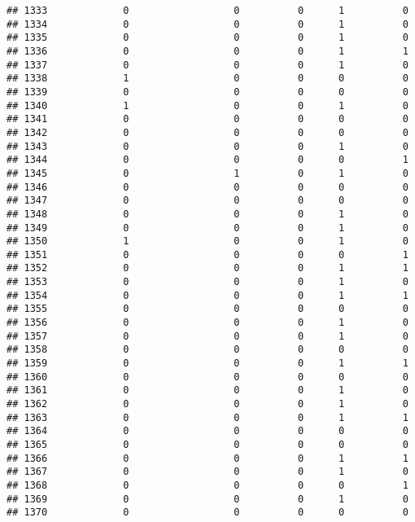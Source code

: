 \documentclass[
]{article}
\begin{document}
\begin{verbatim}
## 1333             0                  0          0      1          0
## 1334             0                  0          0      1          0
## 1335             0                  0          0      1          0
## 1336             0                  0          0      1          1
## 1337             0                  0          0      1          0
## 1338             1                  0          0      0          0
## 1339             0                  0          0      0          0
## 1340             1                  0          0      1          0
## 1341             0                  0          0      0          0
## 1342             0                  0          0      0          0
## 1343             0                  0          0      1          0
## 1344             0                  0          0      0          1
## 1345             0                  1          0      1          0
## 1346             0                  0          0      0          0
## 1347             0                  0          0      0          0
## 1348             0                  0          0      1          0
## 1349             0                  0          0      1          0
## 1350             1                  0          0      1          0
## 1351             0                  0          0      0          1
## 1352             0                  0          0      1          1
## 1353             0                  0          0      1          0
## 1354             0                  0          0      1          1
## 1355             0                  0          0      0          0
## 1356             0                  0          0      1          0
## 1357             0                  0          0      1          0
## 1358             0                  0          0      0          0
## 1359             0                  0          0      1          1
## 1360             0                  0          0      0          0
## 1361             0                  0          0      1          0
## 1362             0                  0          0      1          0
## 1363             0                  0          0      1          1
## 1364             0                  0          0      0          0
## 1365             0                  0          0      0          0
## 1366             0                  0          0      1          1
## 1367             0                  0          0      1          0
## 1368             0                  0          0      0          1
## 1369             0                  0          0      1          0
## 1370             0                  0          0      0          0

\end{verbatim}
\end{document}
